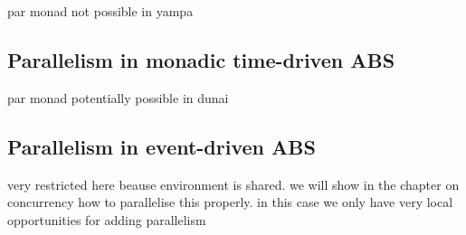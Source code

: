 par monad not possible in yampa

\subsection{Parallelism in monadic time-driven ABS}
par monad potentially possible in dunai

\subsection{Parallelism in event-driven ABS}
very restricted here beause environment is shared. we will show in the chapter on concurrency how to parallelise this properly. in this case we only have very local opportunities for adding parallelism